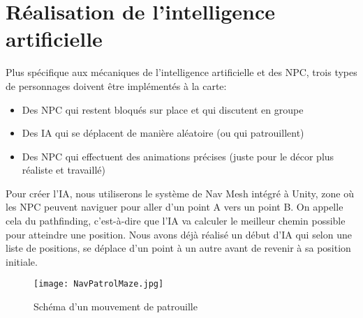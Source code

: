 \documentclass[../doc.tex]{subfiles}
\begin{document}
\section{Réalisation de l'intelligence artificielle}
Plus spécifique aux mécaniques de l'intelligence artificielle et des NPC,
 trois types de personnages doivent être implémentés à la carte:
\begin{itemize}
    \item Des NPC qui restent bloqués sur place et qui discutent en groupe
    \item Des IA qui se déplacent de manière aléatoire (ou qui patrouillent)
    \item Des NPC qui effectuent des animations précises
        (juste pour le décor plus réaliste et travaillé)
\end{itemize}

Pour créer l'IA, nous utiliserons le système de Nav Mesh intégré à Unity, zone où les NPC peuvent naviguer pour aller d'un point A vers un point B.
On appelle cela du pathfinding, c'est-à-dire que l'IA va calculer le meilleur chemin possible pour atteindre une position.
Nous avons déjà réalisé un début d'IA qui selon une liste de positions, se déplace d'un point à un autre avant de revenir à sa position initiale.

\begin{figure}[!htb]
    \centering
    \texttt{[image: NavPatrolMaze.jpg]}
    \caption{Schéma d'un mouvement de patrouille}
\end{figure}
\end{document}

